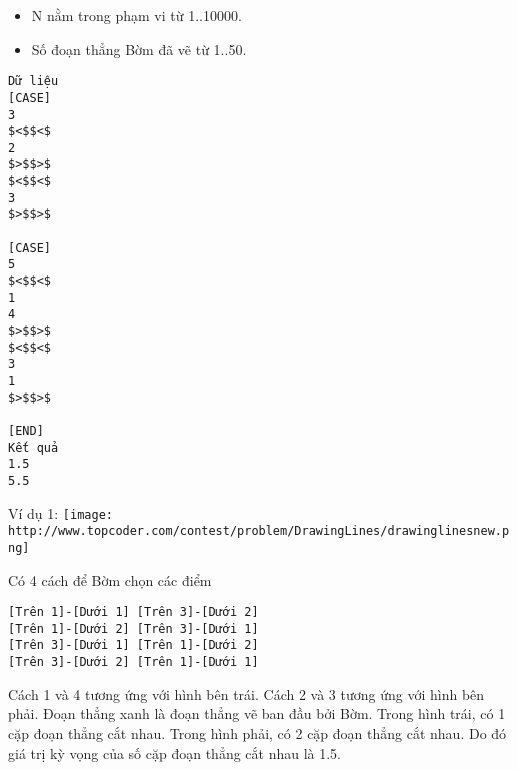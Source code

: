 \begin{itemize}
	\item     N nằm trong phạm vi từ 1..10000.   
	\item     Số đoạn thẳng Bờm đã vẽ từ 1..50.   
\end{itemize}
\begin{verbatim}
Dữ liệu
[CASE]
3
$<$$<$
2
$>$$>$
$<$$<$
3
$>$$>$

[CASE]
5
$<$$<$
1
4
$>$$>$
$<$$<$
3
1
$>$$>$

[END]
Kết quả
1.5
5.5
\end{verbatim}

   Ví dụ 1:  
\texttt{[image: http://www.topcoder.com/contest/problem/DrawingLines/drawinglinesnew.png]}

   Có 4 cách để Bờm chọn các điểm  
\begin{verbatim}
[Trên 1]-[Dưới 1] [Trên 3]-[Dưới 2]
[Trên 1]-[Dưới 2] [Trên 3]-[Dưới 1]
[Trên 3]-[Dưới 1] [Trên 1]-[Dưới 2]
[Trên 3]-[Dưới 2] [Trên 1]-[Dưới 1]
\end{verbatim}

   Cách 1 và 4 tương ứng với hình bên trái. Cách 2 và 3 tương ứng với hình bên phải. Đoạn thẳng xanh là đoạn thẳng vẽ ban đầu bởi Bờm. Trong hình trái, có 1 cặp đoạn thẳng cắt nhau. Trong hình phải, có 2 cặp đoạn thẳng cắt nhau. Do đó giá trị kỳ vọng của số cặp đoạn thẳng cắt nhau là 1.5.